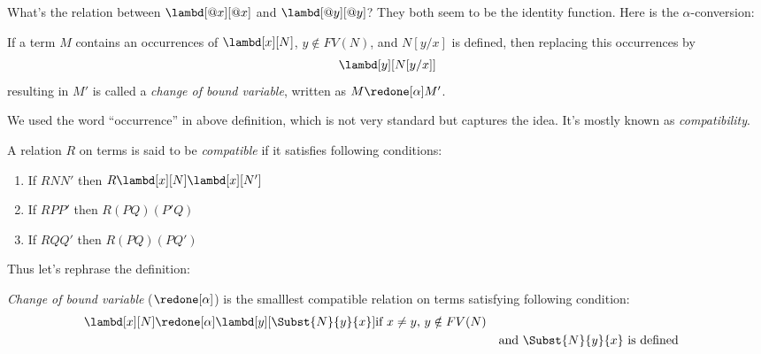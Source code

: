 \documentclass[../../../include/open-logic-section]{subfiles}
\begin{document}

What's the relation between $\lambd[@x][@x]$ and $\lambd[@y][@y]$? They
both seem to be the identity function. Here is the $\alpha$-conversion:

\begin{defn}
  If a term $M$ contains an occurrences of $\lambd[x][N]$, $y \notin
  FV(N)$, and $N[y/x]$ is defined, then replacing this occurrences
  by 
  \begin{equation*}
    \lambd[y][N[y/x]]
  \end{equation*}
  resulting in $M'$ is called a \emph{change of bound variable}, written
  as $M \redone[\alpha] M'$.
\end{defn}


We used the word ``occurrence'' in above definition, which is not very
standard but captures the idea. It's mostly known as
\emph{compatibility}. 
\begin{defn}
  A relation $R$ on terms is said to be \emph{compatible}
  if it satisfies following conditions:
  \begin{enumerate}
  \item If $R N N'$ then $R \lambd[x][N] \lambd[x][N']$
  \item If $R P P'$ then $R (PQ) (P'Q)$
  \item If $R Q Q'$ then $R (PQ) (PQ')$
  \end{enumerate}
\end{defn}

Thus let's rephrase the definition:
\begin{defn}
  \emph{Change of bound variable} ($\redone[\alpha]$) is 
  the smalllest compatible relation on terms satisfying following
  condition:
  \begin{align*}
    &\lambd[x][N] \redone[\alpha] \lambd[y][\Subst{N}{y}{x}] \text{if
      $x \neq y$, $y \notin FV(N)$} \\
    & &&\text{and $\Subst{N}{y}{x}$ is defined}
  \end{align*}
\end{defn}
\end{document}
